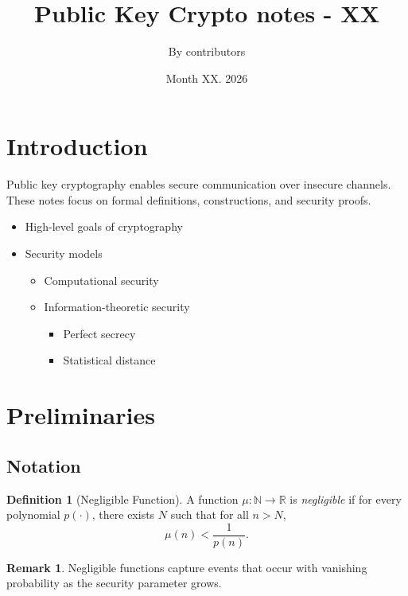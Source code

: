 \documentclass[11pt]{article}
\theoremstyle{definition}
\newtheorem{definition}{Definition}[section]
\newtheorem{remark}{Remark}[section]
\theoremstyle{proof}
\begin{document}
\title{Public Key Crypto notes - XX}
\author{By contributors}
\date{Month XX. 2026}
\maketitle

\section{Introduction}

Public key cryptography enables secure communication over insecure channels.
These notes focus on formal definitions, constructions, and security proofs.

\begin{itemize}
    \item High-level goals of cryptography
    \item Security models
    \begin{itemize}
        \item Computational security
        \item Information-theoretic security
        \begin{itemize}
            \item Perfect secrecy
            \item Statistical distance
        \end{itemize}
    \end{itemize}
\end{itemize}

\section{Preliminaries}

\subsection{Notation}

\begin{definition}[Negligible Function]
A function $\mu : \mathbb{N} \rightarrow \mathbb{R}$ is \emph{negligible} if for every
polynomial $p(\cdot)$, there exists $N$ such that for all $n > N$,
\[
\mu(n) < \frac{1}{p(n)}.
\]
\end{definition}

\begin{remark}
Negligible functions capture events that occur with vanishing probability
as the security parameter grows.
\end{remark}
\end{document}
